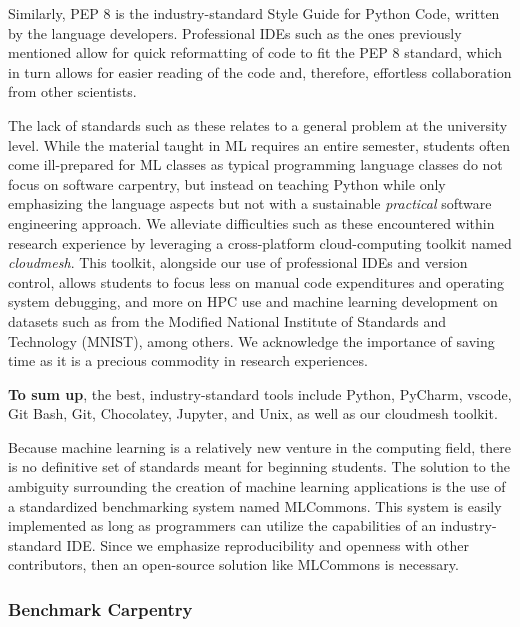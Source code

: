 \documentclass[utf8]{FrontiersinVancouver} %
\begin{document}
Similarly, PEP 8 is the industry-standard Style Guide for Python Code, written by the language developers. Professional IDEs such as the ones previously mentioned allow for quick reformatting of code to fit the PEP 8 standard, which in turn allows for easier reading of the code and, therefore, effortless collaboration from other scientists.

The lack of standards such as these relates to a general problem at the university level. While the material taught in ML requires an entire semester, students often come ill-prepared for ML classes as typical programming language classes do not focus on software carpentry, but instead on teaching Python while only emphasizing the language aspects but not with a sustainable {\em practical} software engineering approach. We alleviate difficulties such as these encountered within research experience by leveraging a cross-platform cloud-computing toolkit named {\em cloudmesh}. This toolkit, alongside our use of professional IDEs and version control, allows students to focus less on manual code expenditures and operating system debugging, and more on HPC use and machine learning development on datasets such as from the Modified National Institute of Standards and Technology (MNIST), among others. We acknowledge the importance of saving time as it is a precious commodity in research experiences.

{\bf To sum up}, the best, industry-standard tools include Python, PyCharm, vscode, Git Bash, Git, Chocolatey, Jupyter, and Unix, as well as our cloudmesh toolkit.

Because machine learning is a relatively new venture in the computing field, there is no definitive set of standards meant for beginning students. The solution to the ambiguity surrounding the creation of machine learning applications is the use of a standardized benchmarking system named MLCommons. This system is easily implemented as long as programmers can utilize the capabilities of an industry-standard IDE. Since we emphasize reproducibility and openness with other contributors, then an open-source solution like MLCommons is necessary.



\subsubsection{Benchmark Carpentry}
\end{document}
